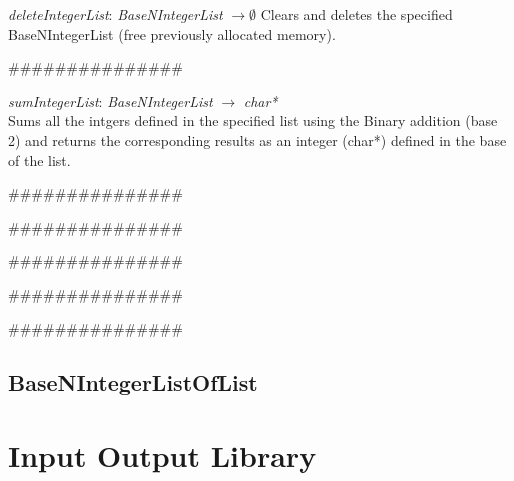 \documentclass[backcover, english, report, nodocumentinfo]{upmethodology-document}
\newcommand{\nxtalgo}{\centerline{$$$$\#\#\#\#\#\#\#\#\#\#\#\#\#\#\#$$$$}}
\begin{document}
		\begin{minipage}{\linewidth}
			\emph{deleteIntegerList}: \emph{BaseNIntegerList} \(\rightarrow \emptyset\)
				Clears and deletes the specified BaseNIntegerList (free previously allocated memory).\\
			\label{algo:BNIL-DeleteIntegerList}
			
		\end{minipage}
		\nxtalgo

		\begin{minipage}{\linewidth}
			\emph{sumIntegerList}: \emph{BaseNIntegerList} \(\rightarrow\) \emph{char*}\\
				Sums all the intgers defined in the specified list using the Binary addition (base 2)
				and returns the corresponding results as an integer (char*) defined in the base of the list.\\
			\label{algo:BNIL-SumIntegerList}
			
		\end{minipage}
		\nxtalgo

		\begin{minipage}{\linewidth}
			\label{algo:BNIL-BaseToInt}
			
		\end{minipage}
		\nxtalgo

		\begin{minipage}{\linewidth}
			\label{algo:BNIL-IntToBase}
			
		\end{minipage}
		\nxtalgo

		\begin{minipage}{\linewidth}
			\label{algo:BNIL-ConvertBaseToBinary}
			
		\end{minipage}
		\nxtalgo

		\begin{minipage}{\linewidth}
			\label{algo:BNIL-ConvertBinaryToBase}
			
		\end{minipage}
		\nxtalgo

		\begin{minipage}{\linewidth}
			\label{algo:BNIL-SumBase}
			
		\end{minipage}
	\section{BaseNIntegerListOfList}
\chapter{Input Output Library}
\end{document}
